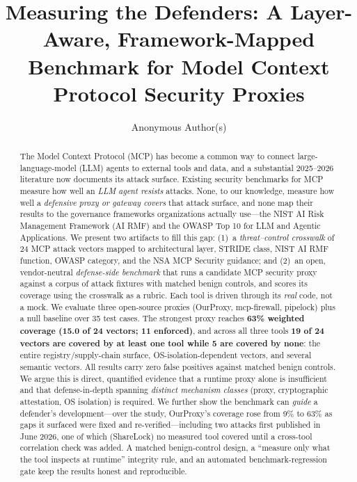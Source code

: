 \documentclass[sigconf,review,anonymous]{acmart}
\begin{document}
\title{Measuring the Defenders: A Layer-Aware, Framework-Mapped Benchmark for Model Context Protocol Security Proxies}

\author{Anonymous Author(s)}

\begin{abstract}
The Model Context Protocol (MCP) has become a common way to connect large-language-model (LLM) agents to external tools and data, and a substantial 2025--2026 literature now documents its attack surface. Existing security benchmarks for MCP measure how well an \emph{LLM agent resists} attacks. None, to our knowledge, measure how well a \emph{defensive proxy or gateway covers} that attack surface, and none map their results to the governance frameworks organizations actually use---the NIST AI Risk Management Framework (AI RMF) and the OWASP Top 10 for LLM and Agentic Applications. We present two artifacts to fill this gap: (1)~a \emph{threat--control crosswalk} of 24 MCP attack vectors mapped to architectural layer, STRIDE class, NIST AI RMF function, OWASP category, and the NSA MCP Security guidance; and (2)~an open, vendor-neutral \emph{defense-side benchmark} that runs a candidate MCP security proxy against a corpus of attack fixtures with matched benign controls, and scores its coverage using the crosswalk as a rubric. Each tool is driven through its \emph{real} code, not a mock. We evaluate three open-source proxies (OurProxy, mcp-firewall, pipelock) plus a null baseline over 35 test cases. The strongest proxy reaches \textbf{63\% weighted coverage (15.0 of 24 vectors; 11 enforced)}, and across all three tools \textbf{19 of 24 vectors are covered by at least one tool while 5 are covered by none}: the entire registry/supply-chain surface, OS-isolation-dependent vectors, and several semantic vectors. All results carry zero false positives against matched benign controls. We argue this is direct, quantified evidence that a runtime proxy alone is insufficient and that defense-in-depth spanning \emph{distinct mechanism classes} (proxy, cryptographic attestation, OS isolation) is required. We further show the benchmark can \emph{guide} a defender's development---over the study, OurProxy's coverage rose from 9\% to 63\% as gaps it surfaced were fixed and re-verified---including two attacks first published in June 2026, one of which (ShareLock) no measured tool covered until a cross-tool correlation check was added. A matched benign-control design, a ``measure only what the tool inspects at runtime'' integrity rule, and an automated benchmark-regression gate keep the results honest and reproducible.
\end{abstract}
\end{document}
